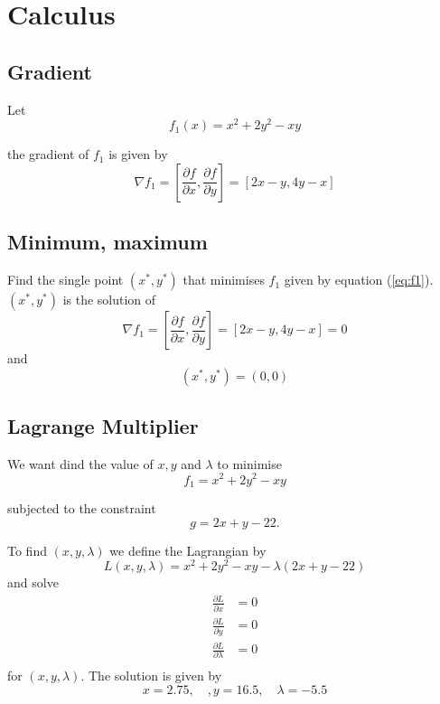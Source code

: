 \documentclass[11pt, oneside]{article}   	%
\begin{document}
\section{Calculus}
\subsection{Gradient}
Let 
\begin{equation}\label{eq:f1}
f_{1}(x) = x^{2}+2y^{2}-xy  
\end{equation}

the gradient of $f_{1}$ is given by 
\begin{equation}
\nabla f_{1} = \left [ \frac{\partial f}{\partial x},   \frac{\partial f}{\partial y} \right ] = [2x-y, 4y-x] \nonumber
\end{equation}

\subsection{Minimum, maximum}
Find the single point $(x^{*}, y^{*})$ that minimises $f_{1}$ given by equation (\ref{eq:f1}).  $(x^{*}, y^{*})$ is the solution of 
\begin{equation}
\nabla f_{1} = \left [ \frac{\partial f}{\partial x},   \frac{\partial f}{\partial y} \right ] = [2x-y, 4y-x] = 0 \nonumber
\end{equation}
and 
\begin{equation}
(x^{*}, y^{*}) = (0,0)\nonumber 
\end{equation}

\subsection{Lagrange Multiplier}
We want dind the value of $x, y$ and $\lambda$  to minimise 
\begin{equation}
f_{1} = x^{2}+2y^{2}-xy \nonumber
\end{equation}

subjected to the constraint
\begin{equation}
g = 2x+y-22 \nonumber.
\end{equation}

To find $(x,y,\lambda)$ we define the Lagrangian by
\begin{equation}
L(x,y,\lambda) = x^{2}+2y^{2}-xy-\lambda(2x+y-22)
\end{equation}
and solve 
\begin{equation}
\begin{aligned}
\frac{\partial L}{\partial x}&= 0\\
\frac{\partial L}{\partial y}&= 0\\
\frac{\partial L}{\partial \lambda}&= 0\\
\end{aligned}
\end{equation}
for $(x,y,\lambda)$.
The solution is given by
\begin{equation}
x = 2.75,\quad, y = 16.5, \quad \lambda = -5.5 \nonumber
\end{equation}
\end{document}
